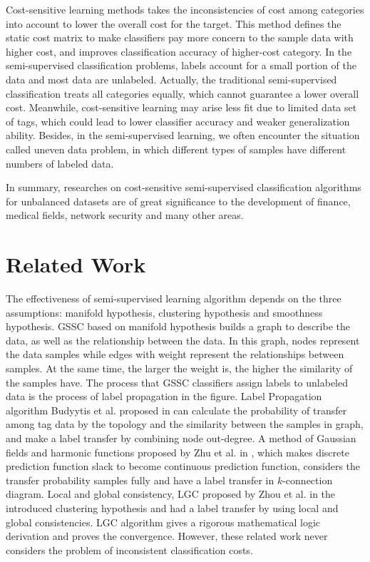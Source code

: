 \documentclass{svjour3}                     %
\begin{document}
Cost-sensitive learning methods \cite{gao2011active,elkan2001foundations,zhou2010multi,domingos1999metacost,fan1999adacost} takes the inconsistencies of cost among categories into account to lower the overall cost for the target. This method defines the static cost matrix to make classifiers pay more concern to the sample data with higher cost, and improves classification accuracy of higher-cost category. In the semi-supervised classification problems, labels account for a small portion of the data and most data are unlabeled. Actually, the traditional semi-supervised classification treats all categories equally, which cannot guarantee a lower overall cost. Meanwhile, cost-sensitive learning may arise less fit due to limited data set of tags, which could lead to lower classifier accuracy and weaker generalization ability. Besides, in the semi-supervised learning, we often encounter the situation called uneven data problem, in which different types of samples have different numbers of labeled data.

In summary, researches on cost-sensitive semi-supervised classification algorithms for unbalanced datasets are of great significance to the development of finance, medical fields, network security and many other areas.

\section{Related Work}
The effectiveness of semi-supervised learning algorithm depends on the three assumptions: manifold hypothesis\cite{urner2011access,zhou2010semi}, clustering hypothesis\cite{9dbeb174-0e9b-4063-a60f-00d96e76db04} and smoothness hypothesis. GSSC based on manifold hypothesis builds a graph to describe the data, as well as the relationship between the data. In this graph, nodes represent the data samples while edges with weight represent the relationships between samples. At the same time, the larger the weight is, the higher the similarity of the samples have. The process that GSSC classifiers assign labels to unlabeled data is the process of label propagation in the figure. Label Propagation algorithm Budyytis et al. proposed in \cite{budvytis2010label}  can calculate the probability of transfer among tag data by the topology and the similarity between the samples in graph, and make a label transfer by combining node out-degree. A method of Gaussian fields and harmonic functions proposed by Zhu et al. in \cite{zhu2003semi}, which makes discrete prediction function slack to become continuous prediction function, considers the transfer probability samples fully and have a label transfer in $k$-connection diagram. Local and global consistency, LGC proposed by Zhou et al. in the \cite{zhou2004learning} introduced clustering hypothesis and had a label transfer by using local and global consistencies. LGC algorithm gives a rigorous mathematical logic derivation and proves the convergence. However, these related work never considers the problem of inconsistent classification costs.
\end{document}
